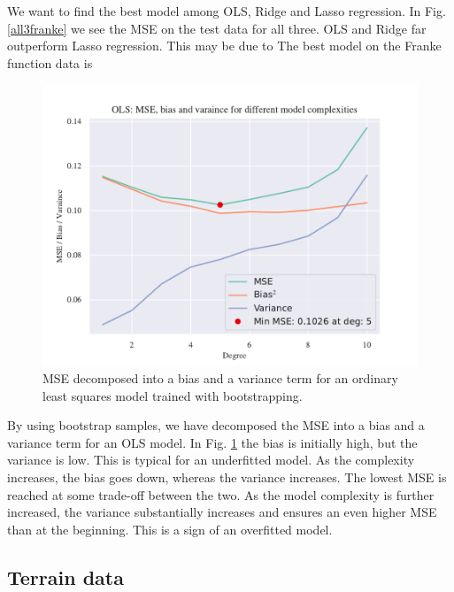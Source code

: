 We want to find the best model among OLS, Ridge and Lasso regression. In Fig. \ref{all3franke} we see the MSE on the test data for all three. OLS and Ridge far outperform Lasso regression. This may be due to  The best model on the Franke function data is 


\begin{figure}
    \centering
    \includegraphics[width=1\linewidth]{project_1/figures/figures_in_report/bias_var_Franke_Noise_bootstrap.pdf}
    \caption{MSE decomposed into a bias and a variance term for an ordinary least squares model trained with bootstrapping.
}
    \label{bias_var_trade}
\end{figure}

By using bootstrap samples, we have decomposed the MSE into a bias and a variance term for an OLS model. 
In Fig. \ref{bias_var_trade} the bias is initially high, but the variance is low. This is typical for an underfitted model. As the complexity increases, the bias goes down, whereas the variance increases. The lowest MSE is reached at some trade-off between the two. As the model complexity is further increased, the variance substantially increases and ensures an even higher MSE than at the beginning. This is a sign of an overfitted model.

\subsection{Terrain data}

